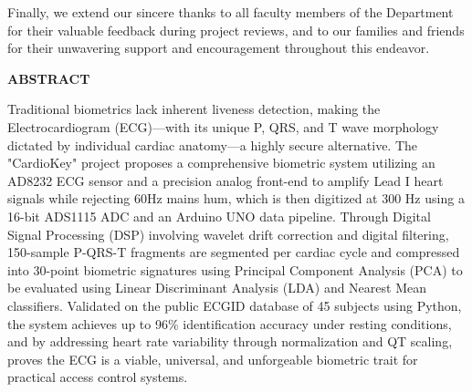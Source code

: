 \documentclass[12pt,a4paper]{report}
\begin{document}
Finally, we extend our sincere thanks to all faculty members of the Department for their valuable feedback during project reviews, and to our families and friends for their unwavering support and encouragement throughout this endeavor.

\newpage
\begin{center}
\Large \textbf{ABSTRACT}\\[1cm]
\end{center}
\vspace{14pt}

Traditional biometrics lack inherent liveness detection, making the Electrocardiogram (ECG)—with its unique P, QRS, and T wave morphology dictated by individual cardiac anatomy—a highly secure alternative. The "CardioKey" project proposes a comprehensive biometric system utilizing an AD8232 ECG sensor and a precision analog front-end to amplify Lead I heart signals while rejecting 60Hz mains hum, which is then digitized at 300 Hz using a 16-bit ADS1115 ADC and an Arduino UNO data pipeline. Through Digital Signal Processing (DSP) involving wavelet drift correction and digital filtering, 150-sample P-QRS-T fragments are segmented per cardiac cycle and compressed into 30-point biometric signatures using Principal Component Analysis (PCA) to be evaluated using Linear Discriminant Analysis (LDA) and Nearest Mean classifiers. Validated on the public ECGID database of 45 subjects using Python, the system achieves up to 96\% identification accuracy under resting conditions, and by addressing heart rate variability through normalization and QT scaling, proves the ECG is a viable, universal, and unforgeable biometric trait for practical access control systems.

\newpage

\renewcommand{\contentsname}{CONTENTS}
\renewcommand{\listfigurename}{LIST OF FIGURES}
\renewcommand{\listtablename}{LIST OF TABLES}

\renewcommand{\cfttoctitlefont}{\hfill\normalfont\fontsize{16}{19}\bfseries}
\renewcommand{\cftaftertoctitle}{\hfill\mbox{}}
\tableofcontents
\end{document}
